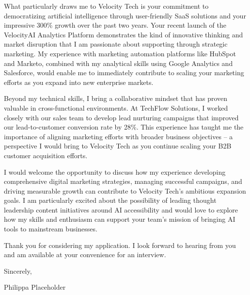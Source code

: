 \documentclass{resumeclass}
\begin{document}
What particularly draws me to Velocity Tech is your commitment to democratizing 
artificial intelligence through user-friendly SaaS solutions and your impressive 
300\% growth over the past two years. Your recent launch of the VelocityAI 
Analytics Platform demonstrates the kind of innovative thinking and market 
disruption that I am passionate about supporting through strategic marketing. My 
experience with marketing automation platforms like HubSpot and Marketo, 
combined with my analytical skills using Google Analytics and Salesforce, would 
enable me to immediately contribute to scaling your marketing efforts as you 
expand into new enterprise markets.

Beyond my technical skills, I bring a collaborative mindset that has proven 
valuable in cross-functional environments. At TechFlow Solutions, I worked 
closely with our sales team to develop lead nurturing campaigns that improved 
our lead-to-customer conversion rate by 28\%. This experience has taught me the 
importance of aligning marketing efforts with broader business objectives – a 
perspective I would bring to Velocity Tech as you continue scaling your B2B 
customer acquisition efforts.

I would welcome the opportunity to discuss how my experience developing 
comprehensive digital marketing strategies, managing successful campaigns, and 
driving measurable growth can contribute to Velocity Tech's ambitious expansion 
goals. I am particularly excited about the possibility of leading thought 
leadership content initiatives around AI accessibility and would love to explore 
how my skills and enthusiasm can support your team's mission of bringing AI 
tools to mainstream businesses.

Thank you for considering my application. I look forward to hearing from you and 
am available at your convenience for an interview.

Sincerely,


Philippa Placeholder
\end{document}

